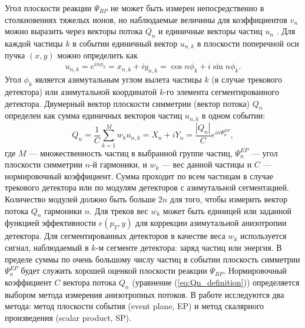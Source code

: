 Угол плоскости реакции $\Psi_{RP}$ не может быть измерен непосредственно в столкновениях тяжелых ионов, но наблюдаемые величины для коэффициентов $v_n$ можно выразить через векторы потока $Q_n$ и единичные векторы частиц $u_n$ \cite{Voloshin:2008dg,Selyuzhenkov:2007zi,Mamaev:2023yhz}. 
Для каждой частицы $k$ в событии единичный вектор $u_{n,k}$ в плоскости поперечной оси пучка $(x,y)$ можно определить как
%
\begin{equation}
    u_{n,k}  = e^{in\phi_k} = x_{n,k} + i y_{n,k} =  \cos n\phi_k + i \sin n\phi_k.
    \label{eq:un_definition}
\end{equation}
%
Угол  $\phi_k$ является азимутальным углом вылета частицы $k$ (в случае трекового детектора) или азимутальной координатой $k$-го элемента сегментированного детектора.
Двумерный вектор плоскости симметрии (вектор потока) $Q_n$ определен как сумма единичных векторов частиц $u_{n,k}$ в одном событии:
%
\begin{equation}
    Q_n  = \frac{1}{C} \sum_{k=1}^M w_k u_{n,k} = 
    X_n + iY_n =
    \frac{|Q_n|}{C} e^{in\Psi_n^{EP}},
    \label{eq:Qn_definition}
\end{equation}
%
где $M$ --- множественность частиц в выбранной группе частиц, $\Psi_n^{EP}$ --- угол плоскости симметрии $n$-й гармоники, и $w_k$ --- вес данной частицы и $C$ --- нормировочный коэффициент.
Сумма проходит по всем частицам в случае трекового детектора или по модулям детекторов с азимутальной сегментацией. 
Количество модулей должно быть больше 2$n$ для того, чтобы измерить вектор потока $Q_n$ гармоники $n$.
Для треков вес $w_k$  может быть единицей или заданной функцией эффективности $e(p_T,y)$ для коррекции азимутальной анизотропии детектора.
Для сегментированных детекторов в качестве веса $w_k$   используется сигнал, наблюдаемый в $k$-м сегменте детектора: заряд частиц или энергия. 
В пределе суммы по очень большому числу частиц в событии плоскость симметрии $\Psi_n^{EP}$ будет служить хорошей оценкой плоскости реакции $\Psi_{RP}$.
Нормировочный коэффициент $C$ вектора потока $Q_n$ (уравнение (\ref{eq:Qn_definition})) определяется выбором метода измерения анизотропных потоков.
В работе исследуются два метода: метод плоскости события (event plane, EP) и  метод скалярного произведения (scalar product, SP).

